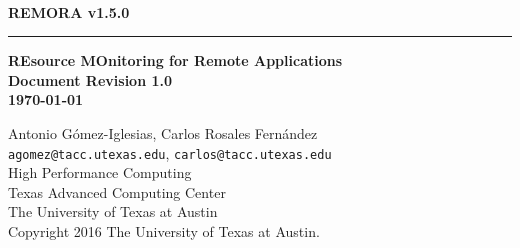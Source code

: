 \documentclass[10pt,a4paper]{report}
\begin{document}
\begin{titlepage}
\thispagestyle{empty}	%
\verb+ +
\vspace{1em}
\begin{flushright}
\huge\bf REMORA v1.5.0\\
\rule{\textwidth}{4pt}
\large{\bf REsource MOnitoring for Remote Applications\\
Document Revision 1.0\\
\today}
\end{flushright}

\newpage
\thispagestyle{empty}
\begin{flushleft}
Antonio G\'omez-Iglesias, Carlos Rosales Fern\'andez \\
\verb+agomez@tacc.utexas.edu+, \verb+carlos@tacc.utexas.edu+\\
\vspace{0.5em}
High Performance Computing \\
Texas Advanced Computing Center\\
The University of Texas at Austin\\
\vspace{1cm}
Copyright 2016 The University of Texas at Austin.
\end{flushleft}
\newpage
\end{titlepage}
\end{document}
